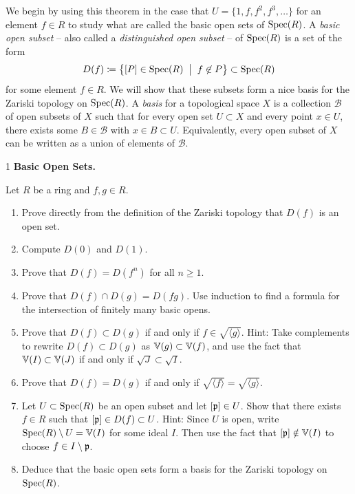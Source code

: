 \documentclass[Notebook.tex]{subfiles}
\begin{document}
We begin by using this theorem in the case that $U=\{1,f,f^2,f^3,\ldots\}$ for an element $f \in R$ to study what are called the basic open sets of $\operatorname{Spec}(R)$. A \emph{basic open subset} -- also called a \emph{distinguished open subset} -- of $\operatorname{Spec}(R)$ is a set of the form
\[
D(f) \coloneqq \left\{ [P] \in \operatorname{Spec}(R) \;\; \big| \;\; f \not \in P\right\}  \subset \operatorname{Spec}(R)
\]
for some element $f\in R$. We will show that these subsets form a nice basis for the Zariski topology on $\operatorname{Spec}(R)$. A \emph{basis} for a topological space $X$ is a collection $\mathcal{B}$ of open subsets of $X$ such that for every open set $U \subset X$ and every point $x \in U$, there exists some $B \in \mathcal{B}$ with $x \in B \subset U$. Equivalently, every open subset of $X$ can be written as a union of elements of $\mathcal{B}$.


\hrulefill

\newpage

\begin{problem}{1}
    \textbf{Basic Open Sets.} 
    
    Let $R$ be a ring and $f,g \in R$.
    \begin{enumerate}
        \item Prove directly from the definition of the Zariski topology that $D(f)$ is an open set. 
        \item Compute $D(0)$ and $D(1)$. 
        \item Prove that $D(f) = D(f^{n})$ for all $n\geq1$. 
        \item Prove that $D(f) \cap D(g) = D(fg)$. Use induction to find a formula for the intersection of finitely many basic opens. 
        \item Prove that $D(f)\subset D(g)$ if and only if $f\in \sqrt{\langle g\rangle}$. Hint: Take complements to rewrite $D(f)\subset D(g)$ as $\mathbb V(g)\subset \mathbb V(f)$, and use the fact that $\mathbb V(I)\subset \mathbb V(J)$ if and only if $\sqrt{J}\subset \sqrt{I}$.
        \item Prove that $D(f) = D(g)$ if and only if $\sqrt{\langle f \rangle} = \sqrt{\langle g \rangle}$. 
        \item Let $U\subset \operatorname{Spec}(R)$ be an open subset and let $[\operatorname{\mathfrak{p}}] \in U$. Show that there exists $f\in R$ such that $[\operatorname{\mathfrak{p}}] \in D(f) \subset U$. Hint: Since $U$ is open, write $\operatorname{Spec}(R)\setminus U=\mathbb V(I)$ for some ideal $I$. Then use the fact that $[\operatorname{\mathfrak{p}}]\notin \mathbb V(I)$ to choose $f\in I\setminus \operatorname{\mathfrak{p}}$.
        \item Deduce that the basic open sets form a basis for the Zariski topology on $\operatorname{Spec}(R)$. 
    \end{enumerate}
\end{problem}
\end{document}
